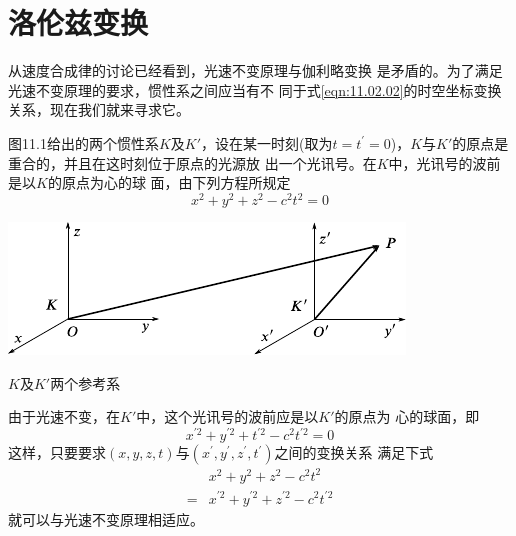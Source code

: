\section{洛伦兹变换}\label{sec:11.04}

从速度合成律的讨论已经看到，光速不变原理与伽利略变换
是矛盾的。为了满足光速不变原理的要求，惯性系之间应当有不
同于式\eqref{eqn:11.02.02}的时空坐标变换关系，现在我们就来寻求它。

图11.1给出的两个惯性系$ K $及$ K' $，设在某一时刻(取为$  t = t ^ { \prime }
=0 $)，$ K $与$ K' $的原点是重合的，并且在这时刻位于原点的光源放
出一个光讯号。在$ K $中，光讯号的波前是以$ K $的原点为心的球
面，由下列方程所规定
\begin{equation*}
    x ^ { 2 } + y ^ { 2 } + z ^ { 2 } - c ^ { 2 } t ^ { 2 } = 0
\end{equation*}

\begin{figurex}
    \centering
    \includegraphics{figure/fig11.01}
    \caption{$ K $及$ K' $两个参考系}
    \label{fig:11.01}
\end{figurex}
由于光速不变，在$ K' $中，这个光讯号的波前应是以$ K' $的原点为
心的球面，即
\begin{equation*}
    x ^ { \prime 2 } + y ^ { \prime 2 } + t ^ { \prime 2 } - c ^ { 2 } t ^ { \prime 2 } = 0
\end{equation*}
这样，只要要求$  \left( x , y , z , t \right)   $与$  \left( x ^ { \prime } , y  ^ { \prime } , z ^ { \prime } , t ^ { \prime } \right) $之间的变换关系
满足下式\vspace{-1.4em}
\begin{equation}\label{eqn:11.04.01}
    \begin{split}
        &x ^ { 2 } + y ^ { 2 } + z ^ { 2 } - c ^ { 2 } t ^ { 2 }  \\[-0.3em]
= &x ^ { \prime 2 } + y ^ { \prime 2 } + z ^ { \prime 2 } - c ^ { 2 } t ^ { \prime 2 }
    \end{split}
\end{equation}
就可以与光速不变原理相适应。

